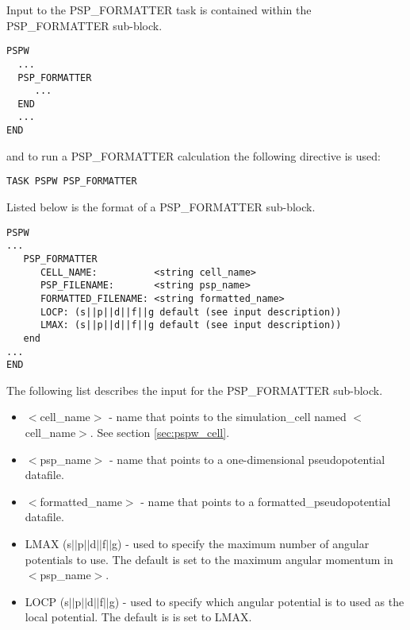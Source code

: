 Input to the PSP\_FORMATTER task is contained
within the PSP\_FORMATTER sub-block.
\begin{verbatim}
PSPW
  ...
  PSP_FORMATTER
     ...
  END
  ...
END
\end{verbatim}
and to run a PSP\_FORMATTER calculation the following directive is used:
\begin{verbatim}
TASK PSPW PSP_FORMATTER
\end{verbatim}
Listed below is the format of a PSP\_FORMATTER sub-block.
\begin{verbatim}
PSPW
... 
   PSP_FORMATTER
      CELL_NAME:          <string cell_name> 
      PSP_FILENAME:       <string psp_name>
      FORMATTED_FILENAME: <string formatted_name>
      LOCP: (s||p||d||f||g default (see input description))
      LMAX: (s||p||d||f||g default (see input description))
   end
...
END
\end{verbatim}
The following list describes the input for the PSP\_FORMATTER
sub-block.
\begin{itemize}
        \item $<$cell\_name$>$ - name that points 
                to the simulation\_cell named $<$cell\_name$>$.  See section \ref{sec:pspw_cell}.
        \item $<$psp\_name$>$ - name that points
              to a one-dimensional pseudopotential datafile.
        \item $<$formatted\_name$>$ -  
              name that points to a formatted\_pseudopotential datafile.
        \item LMAX (s$||$p$||$d$||$f$||$g) - used to specify the maximum number
              of angular potentials to use. The default is set to the maximum
              angular momentum in $<$psp\_name$>$.
        \item LOCP (s$||$p$||$d$||$f$||$g) - used to specify which angular potential
              is to used as the local potential.  The default is is set to LMAX.
\end{itemize}




